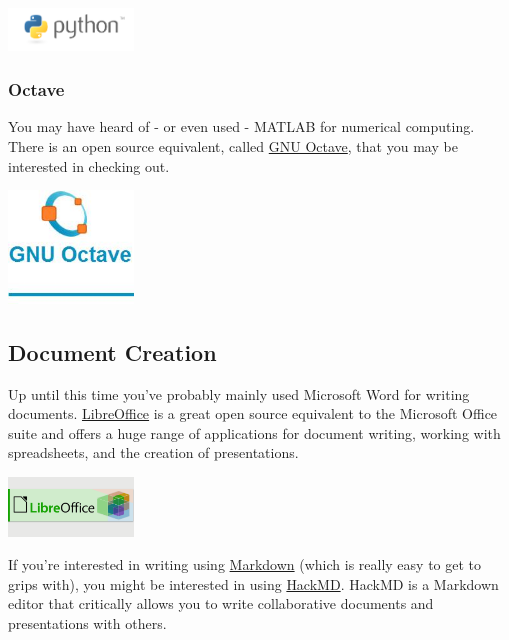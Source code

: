 \documentclass[
]{book}
\begin{document}
\href{https://www.python.org}{\includegraphics[width=0.25\textwidth,height=\textheight]{images/python-logo-master-v3-TM.png}}

\hypertarget{octave}{%
\subsubsection*{Octave}\label{octave}}

You may have heard of - or even used - MATLAB for numerical computing. There is an open source equivalent, called \href{https://www.gnu.org/software/octave/}{GNU Octave}, that you may be interested in checking out.

\href{https://www.gnu.org/software/octave/}{\includegraphics[width=0.25\textwidth,height=\textheight]{images/gnuoctave.jpg}}

\hypertarget{document-creation}{%
\subsection{Document Creation}\label{document-creation}}

Up until this time you've probably mainly used Microsoft Word for writing documents. \href{https://www.libreoffice.org}{LibreOffice} is a great open source equivalent to the Microsoft Office suite and offers a huge range of applications for document writing, working with spreadsheets, and the creation of presentations.

\href{https://www.libreoffice.org}{\includegraphics[width=0.25\textwidth,height=\textheight]{images/LibreOffice-6.4.png}}

If you're interested in writing using \href{https://www.markdownguide.org}{Markdown} (which is really easy to get to grips with), you might be interested in using \href{https://opensource.com/article/19/7/enable-collaboration-hackmd}{HackMD}. HackMD is a Markdown editor that critically allows you to write collaborative documents and presentations with others.
\end{document}
